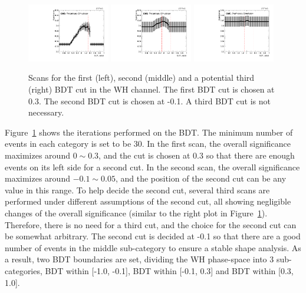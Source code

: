 \begin{figure}[!htb]
  \centering
  \captionsetup{justification=justified}
  \includegraphics[width=0.32\textwidth]{pics/VH_sec/VH_BDT_cats/WH_BDT_scan1.pdf}
  \includegraphics[width=0.32\textwidth]{pics/VH_sec/VH_BDT_cats/WH_BDT_scan2.pdf}
  \includegraphics[width=0.32\textwidth]{pics/VH_sec/VH_BDT_cats/WH_BDT_scan3.pdf}
  \caption{Scans for the first (left), second (middle) and a potential third (right) BDT cut in the WH channel.
           The first BDT cut is chosen at 0.3. The second BDT cut is chosen at -0.1. A third BDT cut is not necessary.}
  \label{fig:wh_bdt_cat_scan}
\end{figure}

Figure~\ref{fig:wh_bdt_cat_scan} shows the iterations performed on the \WH BDT. 
The minimum number of events in each category is set to be 30.
In the first scan, the overall significance maximizes around $0 \sim 0.3$, 
and the cut is chosen at 0.3 so that there are enough events on its left side for a second cut.
In the second scan, the overall significance maximizes around $-0.1 \sim 0.05$,
and the position of the second cut can be any value in this range.
To help decide the second cut, several third scans are performed under different assumptions of the second cut,
all showing negligible changes of the overall significance (similar to the right plot in Figure~\ref{fig:wh_bdt_cat_scan}).
Therefore, there is no need for a third cut, and the choice for the second cut can be somewhat arbitrary.
The second cut is decided at -0.1 so that there are a good number of events in the middle sub-category to ensure a stable shape analysis.  
As a result, two BDT boundaries are set, dividing the WH phase-space into 3 sub-categories, 
BDT within [-1.0, -0.1], BDT within [-0.1, 0.3] and BDT within [0.3, 1.0].

